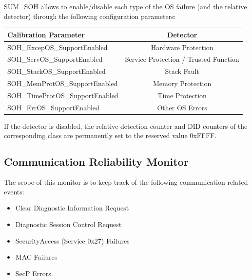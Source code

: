{
SUM\_SOH allows to enable/disable each type of the OS failure (and the relative detector) through the following configuration parameters: \newline


\begin{center}\begin{tabular}{|l|c|}
\hline
\textbf{Calibration Parameter}   & \textbf{Detector}            \\ \hline
SOH_ExcepOS_SupportEnabled       &  Hardware Protection    \\ \hline
SOH_ServOS_SupportEnabled        &  Service Protection / Trusted Function              \\ \hline
SOH_StackOS_SupportEnabled       &  Stack Fault                   \\ \hline
SOH_MemProtOS_SupportEnabled     &  Memory Protection              \\ \hline
SOH_TimeProtOS_SupportEnabled    &  Time Protection               \\ \hline
SOH_ErrOS_SupportEnabled         &  Other OS Errors                \\ \hline 
\hline
\end{tabular}\end{center}


If the detector is disabled, the relative detection counter and DID counters of the corresponding class are permanently set to the reserved value 0xFFFF.
}
{
}


\subsection{Communication Reliability Monitor}
\label{subsection:CommunicationReliabilityMonitor}

{
	The scope of this monitor is to keep track of the following communication-related events:
	\begin{itemize}
		\item Clear Diagnostic Information Request
		\item Diagnostic Session Control Request
		\item SecurityAccess (Service 0x27) Failures
		\item MAC Failures
		\item SecP Errors.
	\end{itemize}
}
{
}

